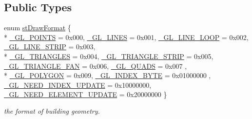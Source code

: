 \subsection*{Public Types}
\begin{DoxyCompactItemize}
\item 
enum \hyperlink{classcsad_1_1_mesh_a0992cfc5c22b440ba3db818112d69caf}{st\-Draw\-Format} \{ \\*
\hyperlink{classcsad_1_1_mesh_a0992cfc5c22b440ba3db818112d69cafa3de5094fd0b896a96ac8843eb26372a6}{\-\_\-\-G\-L\-\_\-\-P\-O\-I\-N\-T\-S} = 0x000, 
\hyperlink{classcsad_1_1_mesh_a0992cfc5c22b440ba3db818112d69cafa96d7f461ff3cafed90a76e265f14000c}{\-\_\-\-G\-L\-\_\-\-L\-I\-N\-E\-S} = 0x001, 
\hyperlink{classcsad_1_1_mesh_a0992cfc5c22b440ba3db818112d69cafae346c44b2296dafed7e79abf41f2a6bc}{\-\_\-\-G\-L\-\_\-\-L\-I\-N\-E\-\_\-\-L\-O\-O\-P} = 0x002, 
\hyperlink{classcsad_1_1_mesh_a0992cfc5c22b440ba3db818112d69cafaea18fe065631e6702ceac01f9c155f5e}{\-\_\-\-G\-L\-\_\-\-L\-I\-N\-E\-\_\-\-S\-T\-R\-I\-P} = 0x003, 
\\*
\hyperlink{classcsad_1_1_mesh_a0992cfc5c22b440ba3db818112d69cafaa46b3b34e5ee3262e70765ca154f8cdb}{\-\_\-\-G\-L\-\_\-\-T\-R\-I\-A\-N\-G\-L\-E\-S} = 0x004, 
\hyperlink{classcsad_1_1_mesh_a0992cfc5c22b440ba3db818112d69cafae8f759bbd5014e890c1747b0da36c1f6}{\-\_\-\-G\-L\-\_\-\-T\-R\-I\-A\-N\-G\-L\-E\-\_\-\-S\-T\-R\-I\-P} = 0x005, 
\hyperlink{classcsad_1_1_mesh_a0992cfc5c22b440ba3db818112d69cafa8738be7b07f76a7973cc552a62848c4f}{\-\_\-\-G\-L\-\_\-\-T\-R\-I\-A\-N\-G\-L\-E\-\_\-\-F\-A\-N} = 0x006, 
\hyperlink{classcsad_1_1_mesh_a0992cfc5c22b440ba3db818112d69cafa7aaba1ec28c778d5791180cabd96f21b}{\-\_\-\-G\-L\-\_\-\-Q\-U\-A\-D\-S} = 0x007
, \\*
\hyperlink{classcsad_1_1_mesh_a0992cfc5c22b440ba3db818112d69cafa00abba265b60e709f6de1a7ba813cadc}{\-\_\-\-G\-L\-\_\-\-P\-O\-L\-Y\-G\-O\-N} = 0x009, 
\hyperlink{classcsad_1_1_mesh_a0992cfc5c22b440ba3db818112d69cafab4f067437253bdc27c8974215e82cb6d}{\-\_\-\-G\-L\-\_\-\-I\-N\-D\-E\-X\-\_\-\-B\-Y\-T\-E} = 0x01000000
, \hyperlink{classcsad_1_1_mesh_a0992cfc5c22b440ba3db818112d69cafa7d8084eacbd55804437eda4bc3fa056c}{\-\_\-\-G\-L\-\_\-\-N\-E\-E\-D\-\_\-\-I\-N\-D\-E\-X\-\_\-\-U\-P\-D\-A\-T\-E} = 0x10000000, 
\hyperlink{classcsad_1_1_mesh_a0992cfc5c22b440ba3db818112d69cafae5180995c07ee12224726847535634f7}{\-\_\-\-G\-L\-\_\-\-N\-E\-E\-D\-\_\-\-E\-L\-E\-M\-E\-N\-T\-\_\-\-U\-P\-D\-A\-T\-E} = 0x20000000
 \}
\begin{DoxyCompactList}\small\item\em the format of building geometry. \end{DoxyCompactList}\item 

\end{DoxyCompactItemize}
